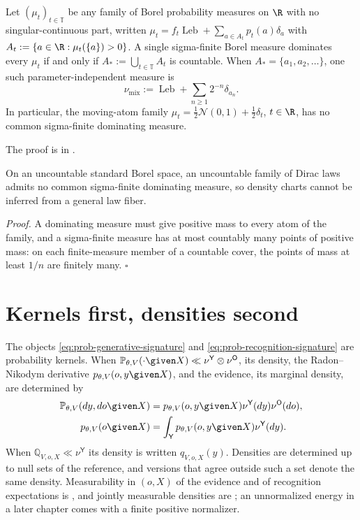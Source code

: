 Let $(\mu_t)_{t\in\mathbb T}$ be any family of Borel probability measures on $\R$ with no
singular-continuous part, written $\mu_t=f_t\operatorname{Leb}+\sum_{a\in A_t}p_t(a)\delta_a$ with
$A_t:=\{a\in\R:\mu_t(\{a\})>0\}$. A single sigma-finite Borel measure dominates every $\mu_t$ if and only
if $A_*:=\bigcup_{t\in\mathbb T}A_t$ is countable. When $A_*=\{a_1,a_2,\ldots\}$, one such
parameter-independent measure is
\begin{equation}
\nu_{\mathrm{mix}}:=\operatorname{Leb}+\sum_{n\geq1}2^{-n}\delta_{a_n}.
\label{eq:prob-mixed-family-reference}
\end{equation}
In particular, the moving-atom family $\mu_t=\tfrac12\mathcal N(0,1)+\tfrac12\delta_t$, $t\in\R$, has no
common sigma-finite dominating measure. 

The proof is in .

On an uncountable standard Borel space, an uncountable family of Dirac laws admits no common
sigma-finite dominating measure, so density charts cannot be inferred from a general law fiber.

\noindent\emph{Proof.}
A dominating measure must give positive mass to every atom of the family, and a sigma-finite measure
has at most countably many points of positive mass: on each finite-measure member of a countable cover,
the points of mass at least $1/n$ are finitely many. \hfill$\square$

\section{Kernels first, densities second}
\label{sec:prob-kernels}

The objects \eqref{eq:prob-generative-signature} and \eqref{eq:prob-recognition-signature} are
probability kernels. When $\mathbb P_{\theta,V}(\cdot\given X)\ll\nu^{\mathsf Y}\otimes\nu^{\mathsf O}$,
its density, the Radon--Nikodym derivative $p_{\theta,V}(o,y\given X)$, and the evidence, its marginal
density, are determined by
\begin{align}
\mathbb P_{\theta,V}(dy,do\given X)&=p_{\theta,V}(o,y\given X)\nu^{\mathsf Y}(dy)\nu^{\mathsf O}(do),
\label{eq:prob-generative-density}\\
p_{\theta,V}(o\given X)&=\int_{\mathsf Y}p_{\theta,V}(o,y\given X)\nu^{\mathsf Y}(dy).
\label{eq:prob-evidence}
\end{align}
When $\mathbb Q_{V,o,X}\ll\nu^{\mathsf Y}$ its density is written $q_{V,o,X}(y)$. Densities are determined
up to null sets of the reference, and versions that agree outside such a set denote the same density.
Measurability in $(o,X)$ of the evidence and of recognition expectations is
, and jointly measurable densities are
; an unnormalized energy in a later chapter comes with a finite
positive normalizer.

